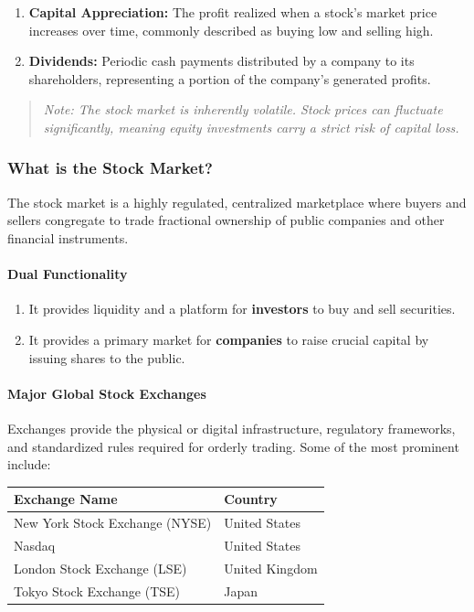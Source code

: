 \documentclass[12pt,openany]{book}
\begin{document}
\begin{enumerate}[leftmargin=*]
    \item \textbf{Capital Appreciation:} The profit realized when a stock's market price increases over time, commonly described as buying low and selling high.
    \item \textbf{Dividends:} Periodic cash payments distributed by a company to its shareholders, representing a portion of the company's generated profits.
\end{enumerate}

\begin{quote}
\textit{Note: The stock market is inherently volatile. Stock prices can fluctuate significantly, meaning equity investments carry a strict risk of capital loss.}
\end{quote}

\subsubsection{What is the Stock Market?}
The stock market is a highly regulated, centralized marketplace where buyers and sellers congregate to trade fractional ownership of public companies and other financial instruments.

\paragraph{Dual Functionality}
\begin{enumerate}[leftmargin=*]
    \item It provides liquidity and a platform for \textbf{investors} to buy and sell securities.
    \item It provides a primary market for \textbf{companies} to raise crucial capital by issuing shares to the public.
\end{enumerate}

\paragraph{Major Global Stock Exchanges}
Exchanges provide the physical or digital infrastructure, regulatory frameworks, and standardized rules required for orderly trading. Some of the most prominent include:

\begin{center}
\begin{tabular}{|p{}|p{}|}
\hline
\textbf{Exchange Name} & \textbf{Country} \\
\hline
New York Stock Exchange (NYSE) & United States \\
\hline
Nasdaq & United States \\
\hline
London Stock Exchange (LSE) & United Kingdom \\
\hline
Tokyo Stock Exchange (TSE) & Japan \\
\hline
\end{tabular}
\end{center}
\end{document}
